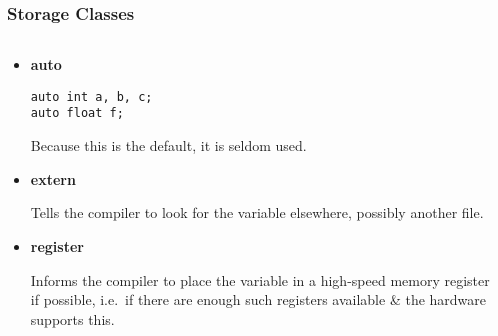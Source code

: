 \begin{frame}[fragile]
\frametitle{Storage Classes}

\begin{columns}

\begin{column}{0.45\textwidth}
\begin{itemize}[<+->]
\item {\bf auto}
\begin{verbatim}
auto int a, b, c;
auto float f;
\end{verbatim}
Because this is the default, it is seldom used.

\item {\bf extern}

Tells the compiler to look for the variable elsewhere,
possibly another file.

\item {\bf register}

Informs the compiler to place the variable in a high-speed
memory register if possible, i.e.\ if there are enough such
registers available \& the hardware supports this.
\end{itemize}
\end{column}

\pause
\begin{column}{0.45\textwidth}

\pause
{}
\end{column}

\end{columns}
\end{frame}
